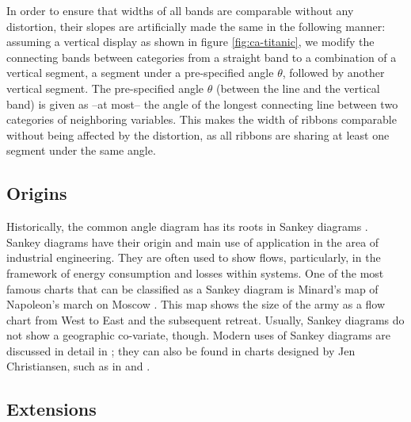 In order to ensure that  widths of all bands are  comparable without any distortion, their slopes  are artificially made the same in the following manner: 
assuming a vertical display as shown in figure \ref{fig:ca-titanic}, we modify  the connecting bands between  categories from a straight band  to a combination of a vertical  segment, a  segment under a pre-specified angle $\theta$, followed by another vertical  segment.  
The pre-specified angle $\theta$ (between the line and the vertical band) is given as --at most-- the angle of the longest connecting line between two categories of neighboring variables. 
This makes the width of ribbons  comparable without being affected by the distortion, as all ribbons are sharing at least one segment under the same angle. 

\subsection{Origins}
Historically, the common angle diagram has its roots in Sankey diagrams \citep{sankey:1898}. Sankey diagrams have their origin and main use of application in the area of industrial engineering. They are often used to show flows,  particularly, in the framework of energy consumption and losses within systems.
One of the most famous charts that can be classified as a Sankey diagram is Minard's map of Napoleon's march on Moscow \citep{minard:1812}. This map  shows the size of the army as a flow chart from West to East and the subsequent retreat. Usually, Sankey diagrams do not show a geographic co-variate, though. Modern uses of Sankey diagrams are discussed in  detail in \citep{schmidt:2008};  they can also be found in charts designed by Jen Christiansen, such as in \cite{jen3} and \cite{jen2}.

%

\subsection{Extensions}

